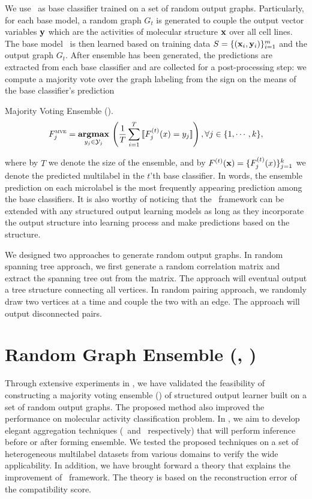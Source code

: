 {We use \mmcrf\ as base classifier trained on a set of random output graphs.
Particularly, for each base model, a random graph $G_t$ is generated to couple the output vector variables $\mathbf {y}$ which are the activities of molecular structure $\mathbf {x}$ over all cell lines.
The base model \mmcrf\ is then learned based on training data $S=\{(\mathbf {x}_i,\mathbf {y}_i)\}_{i=1}^{m}$ and the output graph $G_t$.
After ensemble has been generated, the predictions are extracted from each base classifier and are collected for a post-processing step: we compute a majority vote over the graph labeling from the sign on the means of the base classifier's prediction
\begin{definition}{Majority Voting Ensemble (\mve).}
\begin{align*}
	F_j^{\text{{\sc mve}}}=\underset{y_j\in\mathcal{Y}_j}{\textbf{argmax}}\,\left(\frac{1}{T}\sum_{i=1}^{T}{\llbracket F_j^{(t)}(x)=y_j \rrbracket}\right), \forall j\in\{1,\cdots,k\},
\end{align*}
\end{definition}
where by $T$ we denote the size of the ensemble, and by $F^{(t)}(\mathbf {x})=\{F^{(t)}_j(x)\}_{j=1}^{k}$ we denote the predicted multilabel in the $t$'th base classifier.
In words, the ensemble prediction on each microlabel is the most frequently appearing prediction among the base classifiers.
It is also worthy of noticing that the \mve\ framework can be extended with any structured output learning models as long as they incorporate the output structure into learning process and make predictions based on the structure.

We designed two approaches to generate random output graphs.
In random spanning tree approach, we first generate a random correlation matrix and extract the spanning tree out from the matrix.
The approach will eventual output a tree structure connecting all vertices.
In random pairing approach, we randomly draw two vertices at a time and couple the two with an edge.
The approach will output disconnected pairs.


\section{Random Graph Ensemble (\amm, \mam)}\label{sc_su14a}

Through extensive experiments in , we have validated the feasibility of constructing a majority voting ensemble (\mve) of structured output learner built on a set of random output graphs.
The proposed method also improved the performance on molecular activity classification problem.
In , we aim to develop elegant aggregation techniques (\amm\ and \mam\ respectively) that will perform inference before or after forming ensemble.
We tested the proposed techniques on a set of heterogeneous multilabel datasets from various domains to verify the wide applicability.
In addition, we have brought forward a theory that explains the improvement of \mam\ framework.
The theory is based on the reconstruction error of the compatibility score.


}
